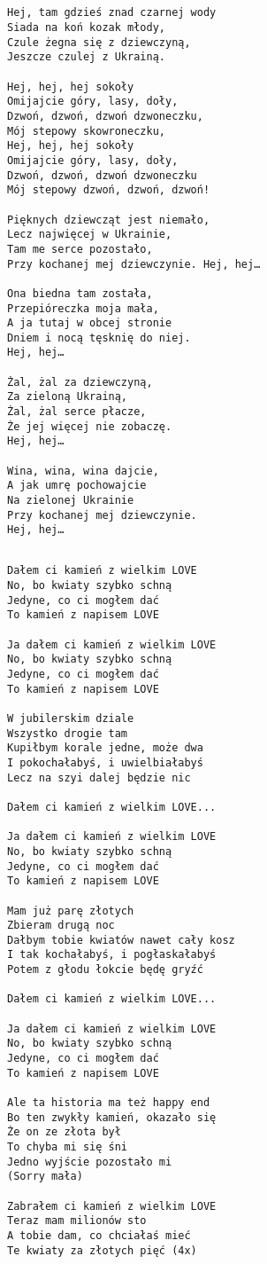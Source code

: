 \documentclass[12pt]{article}
\begin{document}
\subsection*{}
\begin{verbatim}
Hej, tam gdzieś znad czarnej wody
Siada na koń kozak młody,
Czule żegna się z dziewczyną,
Jeszcze czulej z Ukrainą.

Hej, hej, hej sokoły
Omijajcie góry, lasy, doły,
Dzwoń, dzwoń, dzwoń dzwoneczku,
Mój stepowy skowroneczku,
Hej, hej, hej sokoły
Omijajcie góry, lasy, doły,
Dzwoń, dzwoń, dzwoń dzwoneczku
Mój stepowy dzwoń, dzwoń, dzwoń!

Pięknych dziewcząt jest niemało,
Lecz najwięcej w Ukrainie,
Tam me serce pozostało,
Przy kochanej mej dziewczynie. Hej, hej…

Ona biedna tam została,
Przepióreczka moja mała,
A ja tutaj w obcej stronie
Dniem i nocą tęsknię do niej.
Hej, hej…

Żal, żal za dziewczyną,
Za zieloną Ukrainą,
Żal, żal serce płacze,
Że jej więcej nie zobaczę.
Hej, hej…

Wina, wina, wina dajcie,
A jak umrę pochowajcie
Na zielonej Ukrainie
Przy kochanej mej dziewczynie.
Hej, hej…
\end{verbatim}
\clearpage

\subsection*{}
\begin{verbatim}
Dałem ci kamień z wielkim LOVE
No, bo kwiaty szybko schną
Jedyne, co ci mogłem dać
To kamień z napisem LOVE

Ja dałem ci kamień z wielkim LOVE
No, bo kwiaty szybko schną
Jedyne, co ci mogłem dać
To kamień z napisem LOVE

W jubilerskim dziale
Wszystko drogie tam
Kupiłbym korale jedne, może dwa
I pokochałabyś, i uwielbiałabyś
Lecz na szyi dalej będzie nic

Dałem ci kamień z wielkim LOVE...

Ja dałem ci kamień z wielkim LOVE
No, bo kwiaty szybko schną
Jedyne, co ci mogłem dać
To kamień z napisem LOVE

Mam już parę złotych
Zbieram drugą noc
Dałbym tobie kwiatów nawet cały kosz
I tak kochałabyś, i pogłaskałabyś
Potem z głodu łokcie będę gryźć

Dałem ci kamień z wielkim LOVE...

Ja dałem ci kamień z wielkim LOVE
No, bo kwiaty szybko schną
Jedyne, co ci mogłem dać
To kamień z napisem LOVE

Ale ta historia ma też happy end
Bo ten zwykły kamień, okazało się
Że on ze złota był
To chyba mi się śni
Jedno wyjście pozostało mi
(Sorry mała)

Zabrałem ci kamień z wielkim LOVE
Teraz mam milionów sto
A tobie dam, co chciałaś mieć
Te kwiaty za złotych pięć (4x)
\end{verbatim}
\clearpage
\end{document}

